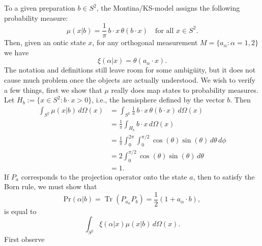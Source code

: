 \documentclass[12pt,draft]{article}
\DeclareMathOperator{\Tr}{Tr}
\theoremstyle{definition}
\theoremstyle{plain}
\begin{document}
{        To a given preparation $b \in S^2$, the
        Montina/KS-model assigns the following probability
        measure: 
        \begin{equation}
            \mu(x | b)
            = \frac{1}{\pi} \, b \cdot x \, \theta(b \cdot
            x)
            \quad \text{for all } x \in S^2.
        \end{equation}
        Then, given an ontic state $x$, for any orthogonal
        measurement $M = \{a_\alpha : \alpha = 1,2 \}$
        we have
        \begin{equation}
            \xi(\alpha | x) 
            = \theta(a_\alpha \cdot x).
        \end{equation}
        The notation and definitions still leave room for
        some ambigüity, but it does not cause much problem
        once the objects are actually understood. We wish to
        verify a few things, first we show that $\mu$ really
        does map states to probability measures. Let $H_b :=
        \{x \in S^2 : b \cdot x > 0\}$, i.e., the hemisphere
        defined by the vector $b$. Then
        \begin{align}
            \int_{S^2} \mu(x | b) \, d\Omega(x)
            &= \int_{S^2} \frac{1}{\pi} \, b \cdot x \,
            \theta(b \cdot x) \, d\Omega(x) \\
            &= \frac{1}{\pi} \int_{H_b} b \cdot x \,
            d\Omega(x) \\
            &= \frac{1}{\pi}
            \int_0^{2\pi} \int_{0}^{\pi / 2}
            \cos(\theta) \sin(\theta) \, d\theta \, d\phi \\
            &= 2 \int_0^{\pi / 2} \cos(\theta) \sin(\theta)
            \, d\theta \\
            &= 1.
        \end{align}
        If $P_a$ corresponds to the projection operator onto
        the state $a$, then to satisfy the Born rule, we
        must show that
        \begin{equation}
            \text{Pr}(\alpha | b)
            = \Tr(P_{a_\alpha} P_b)
            = \frac{1}{2} \left(
                1 + a_\alpha \cdot b
            \right), 
        \end{equation}
        is equal to
        \begin{equation}
            \int_{S^2} \xi(\alpha | x) \mu(x | b) \,
            d\Omega(x).
        \end{equation}
        First observe
        \begin{align}

\end{align}}
\end{document}
